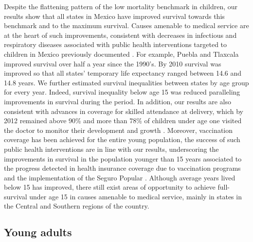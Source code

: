 \documentclass{bmcart}
\begin{document}
Despite the flattening pattern of the low mortality benchmark in children, our results show that all states in Mexico have improved survival towards this benchmark and to the maximum survival. Causes amenable to medical service are at the heart of such improvements, consistent with decreases in infectious and respiratory diseases associated with public health interventions targeted to children in Mexico previously documented \cite{sepulveda2006}. For example, Puebla and Tlaxcala improved survival over half a year since the 1990's. By 2010 survival was improved so that all states' temporary life expectancy ranged between 14.6 and 14.8 years. We further estimated survival inequalities between states by age group for every year.  Indeed, survival inequality below age 15 was reduced paralleling improvements in survival during the period. In addition, our results are also consistent with advances in coverage for skilled attendance at delivery, which by 2012 remained above 90\% and more than 78\% of children under age one visited the doctor to monitor their development and growth  \cite{urquieta2015evolution}. Moreover, vaccination coverage has been achieved for the entire young population, the success of such public health interventions are in line with our results, underscoring the improvements in survival in the population younger than 15 years associated to the progress detected in health insurance coverage due to vaccination programs and the implementation of the Seguro Popular \cite{urquieta2015evolution}. Although average years lived below 15 has improved, there still exist areas of opportunity to achieve full-survival under age 15 in causes amenable to medical service, mainly in states in the Central and Southern regions of the country. 


\subsection*{Young adults}
\end{document}
